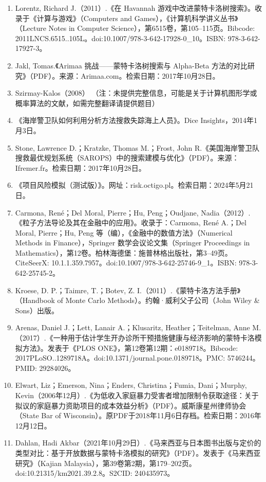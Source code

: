 \begin{enumerate}
\item Lorentz, Richard J.（2011）.《在 Havannah 游戏中改进蒙特卡洛树搜索》。收录于《计算与游戏》（Computers and Games），《计算机科学讲义丛书》（Lecture Notes in Computer Science），第6515卷，第105–115页。Bibcode: 2011LNCS.6515..105L。doi:10.1007/978-3-642-17928-0_10。ISBN: 978-3-642-17927-3。
\item Jakl, Tomas.《Arimaa 挑战——蒙特卡洛树搜索与 Alpha-Beta 方法的对比研究》（PDF）。来源：Arimaa.com。检索日期：2017年10月28日。
\item Szirmay-Kalos（2008）
（注：未提供完整信息，可能是关于计算机图形学或概率算法的文献，如需完整翻译请提供题目）
\item 《海岸警卫队如何利用分析方法搜救失踪海上人员》。Dice Insights，2014年1月3日。
\item Stone, Lawrence D.；Kratzke, Thomas M.；Frost, John R.《美国海岸警卫队搜救最优规划系统（SAROPS）中的搜索建模与优化》（PDF）。来源：Ifremer.fr。检索日期：2017年10月28日。
\item 《项目风险模拟（测试版）》。网址：risk.octigo.pl。检索日期：2024年5月21日。
\item Carmona, René；Del Moral, Pierre；Hu, Peng；Oudjane, Nadia（2012）.《粒子方法导论及其在金融中的应用》。收录于：Carmona, René A.；Del Moral, Pierre；Hu, Peng 等（编），《金融中的数值方法》（Numerical Methods in Finance），Springer 数学会议论文集（Springer Proceedings in Mathematics），第12卷。柏林海德堡：施普林格出版社，第3–49页。CiteSeerX: 10.1.1.359.7957。doi:10.1007/978-3-642-25746-9_1。ISBN: 978-3-642-25745-2。
\item Kroese, D. P.；Taimre, T.；Botev, Z. I.（2011）.《蒙特卡洛方法手册》（Handbook of Monte Carlo Methods）。约翰·威利父子公司（John Wiley & Sons）出版。
\item Arenas, Daniel J.；Lett, Lanair A.；Klusaritz, Heather；Teitelman, Anne M.（2017）.《一种用于估计学生开办诊所干预措施健康与经济影响的蒙特卡洛模拟方法》。发表于《PLOS ONE》，第12卷第12期：e0189718。Bibcode: 2017PLoSO..1289718A。doi:10.1371/journal.pone.0189718。PMC: 5746244。PMID: 29284026。
\item Elwart, Liz；Emerson, Nina；Enders, Christina；Fumia, Dani；Murphy, Kevin（2006年12月）.《为低收入家庭暴力受害者增加限制令获取途径：关于拟议的家庭暴力资助项目的成本效益分析》（PDF）。威斯康星州律师协会（State Bar of Wisconsin）。原PDF于2018年11月6日存档。检索日期：2016年12月12日。
\item Dahlan, Hadi Akbar（2021年10月29日）.《马来西亚与日本图书出版与定价的类型对比：基于开放数据与蒙特卡洛模拟的研究》（PDF）。发表于《马来西亚研究》（Kajian Malaysia），第39卷第2期，第179–202页。doi:10.21315/km2021.39.2.8。S2CID: 240435973。

\end{enumerate}
